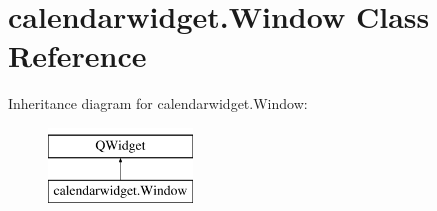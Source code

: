 \hypertarget{classcalendarwidget_1_1Window}{}\section{calendarwidget.\+Window Class Reference}
\label{classcalendarwidget_1_1Window}
Inheritance diagram for calendarwidget.\+Window\+:\begin{figure}[H]
\begin{center}
\leavevmode
\includegraphics[height=2.000000cm]{classcalendarwidget_1_1Window}
\end{center}
\end{figure}
